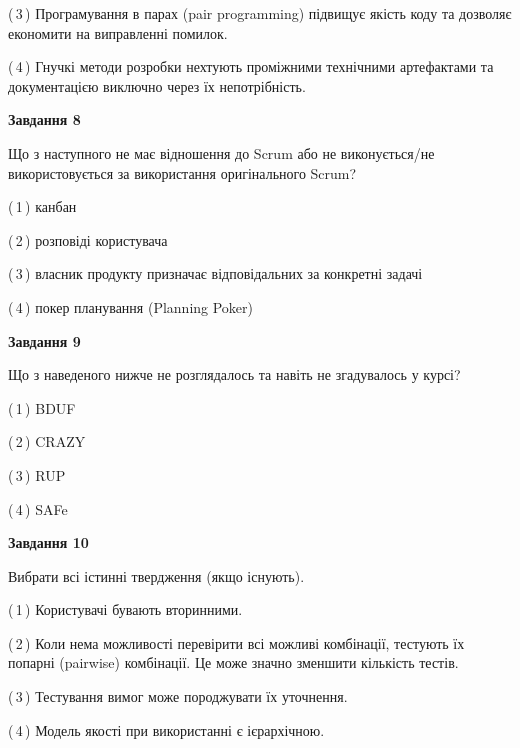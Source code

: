 \documentclass[10pt, ukrainian]{article}
\begin{document}
{\begin {large}
(\,3\,) Програмування в парах (pair programming) підвищує якість коду та дозволяє економити на виправленні помилок. %



(\,4\,) Гнучкі методи розробки нехтують проміжними технічними артефактами та документацією виключно через їх непотрібність. %


{\begin {center}\textbf{Завдання 8}\end {center}}\par
Що з наступного не має відношення до Scrum або не виконується/не використовується за використання оригінального Scrum?\par
\vspace{2mm}



(\,1\,) канбан%



(\,2\,) розповіді користувача%



(\,3\,) власник продукту призначає відповідальних за конкретні задачі%



(\,4\,) покер планування (Planning Poker)%


{\begin {center}\textbf{Завдання 9}\end {center}}\par
Що з наведеного нижче не розглядалось та навіть не згадувалось у курсі?\par
\vspace{2mm}



(\,1\,) BDUF%



(\,2\,) CRAZY%



(\,3\,) RUP%



(\,4\,) SAFe%


{\begin {center}\textbf{Завдання 10}\end {center}}\par
Вибрати всі істинні твердження (якщо існують).\par
\vspace{2mm}



(\,1\,) Користувачі бувають вторинними.%



(\,2\,) Коли нема можливості перевірити всі можливі комбінації, тестують їх попарні (pairwise) комбінації. Це може значно зменшити кількість тестів.%



(\,3\,) Тестування вимог може породжувати їх уточнення.%



(\,4\,) Модель якості при використанні є ієрархічною.%



\end {large}}
\end{document}

